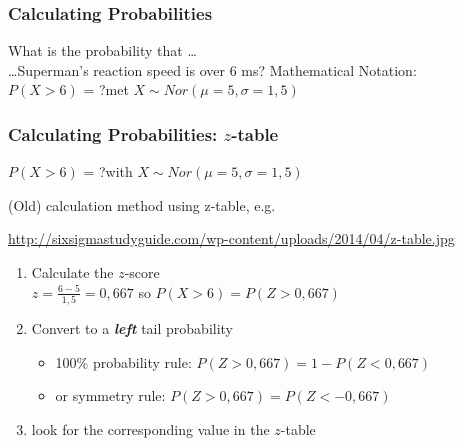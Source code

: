 \documentclass[aspectratio=169]{beamer}
\begin{document}
\begin{frame}
  \frametitle{Calculating Probabilities}
  What is the probability that \dots\\
  \dots Superman's reaction speed is over 6 ms?
  \vfill
  Mathematical Notation:\\
  \hspace{1cm}$P( X > 6)$ = ?\hspace{1cm}met $X \sim Nor(\mu=5,\sigma=1,5)$
  \vfill
  \begin{center}
  \end{center}
\end{frame}

\begin{frame}
  \frametitle{Calculating Probabilities: $z$-table}
  
  $P( X > 6)$ = ?\hspace{1cm}with $X \sim Nor(\mu=5,\sigma=1,5)$
  
  \bigskip
  
  (Old) calculation method using z-table, e.g.
  
  \url{http://sixsigmastudyguide.com/wp-content/uploads/2014/04/z-table.jpg}
  
  \begin{enumerate}
    \pause
    \item Calculate the $z$-score\\
    $z=\frac{6-5}{1,5}=0,667$ so $P(X>6) = P(Z>0,667)$
    \item Convert to a \textbf{\textit{left}} tail probability
    \begin{itemize}
      \item 100\% probability rule: $P(Z>0,667)=1-P(Z<0,667)$
      \item or symmetry rule: $P(Z>0,667)=P(Z<-0,667)$
    \end{itemize}
    \item look for the corresponding value in the $z$-table\\
  \end{enumerate}
\end{frame}
\end{document}
